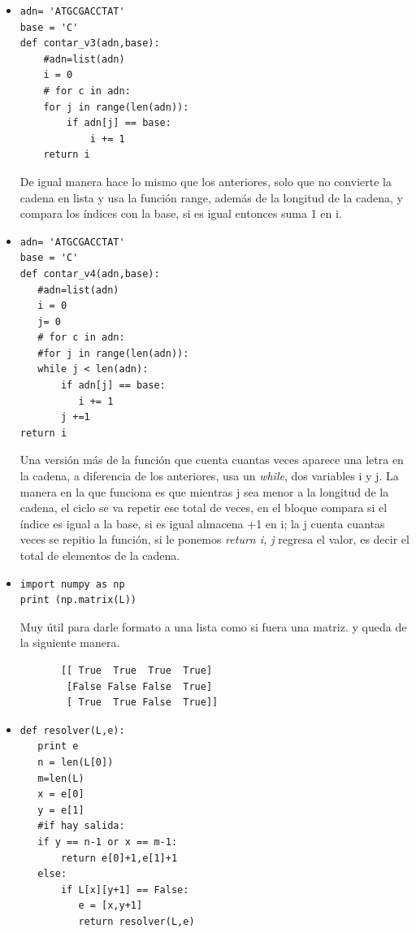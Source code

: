 \documentclass[letterpaper, 12pt,oneside]{article}
\begin{document}
\begin{enumerate}
\begin{itemize}
				\item \begin{lstlisting}
adn= 'ATGCGACCTAT'
base = 'C'
def contar_v3(adn,base):
    #adn=list(adn)
    i = 0
    # for c in adn:
    for j in range(len(adn)):
        if adn[j] == base:
            i += 1
    return i
				\end{lstlisting} De igual manera hace lo mismo que los anteriores, solo que no convierte la cadena en lista y usa la función range, además de la longitud de la cadena, y compara los índices con la base, si es igual entonces suma 1 en i.\\
				
				
				\item \begin{lstlisting}
adn= 'ATGCGACCTAT'
base = 'C'
def contar_v4(adn,base):
   #adn=list(adn)
   i = 0
   j= 0
   # for c in adn:
   #for j in range(len(adn)):
   while j < len(adn):
       if adn[j] == base:
          i += 1
       j +=1
return i
				\end{lstlisting} Una versión más de la función que cuenta cuantas veces aparece una letra en la cadena, a diferencia de los anteriores, usa un \textit{while}, dos variables i y j. La manera en la que funciona es que mientras j sea menor a la longitud de la cadena, el ciclo se va repetir ese total de veces, en el bloque compara si el índice es igual a la base, si es igual almacena +1 en i; la j cuenta cuantas veces se repitio la función, si le ponemos \textit{return i, j} regresa el valor, es decir el total de elementos de la cadena. \\
			
					
				\item \begin{lstlisting}
import numpy as np
print (np.matrix(L)) 
				\end{lstlisting}  Muy útil para darle formato a una lista como si fuera una matriz. y queda de la siguiente manera.\\
				\begin{lstlisting}
       [[ True  True  True  True]
        [False False False  True]
        [ True  True False  True]]
				\end{lstlisting}
				
\newpage
				
				\item \begin{lstlisting}
def resolver(L,e):
   print e
   n = len(L[0])
   m=len(L)
   x = e[0]
   y = e[1]
   #if hay salida:
   if y == n-1 or x == m-1:
       return e[0]+1,e[1]+1 
   else:
       if L[x][y+1] == False:
          e = [x,y+1]
          return resolver(L,e)
  

\end{lstlisting}
\end{itemize}
\end{enumerate}
\end{document}
